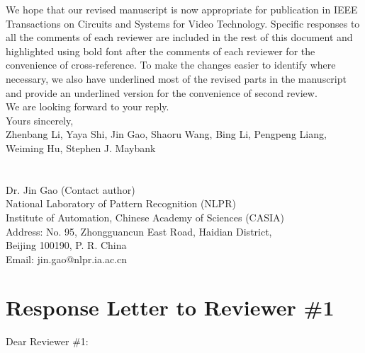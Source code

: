 \documentclass[12pt]{article}
\begin{document}
We hope that our revised manuscript is now appropriate for publication in IEEE Transactions on Circuits and Systems for Video Technology. Specific responses to all the comments of each reviewer are included in the rest of this document and highlighted using bold font after the comments of each reviewer for the convenience of cross-reference. To make the changes easier to identify where necessary, we also have underlined most of the revised parts in the manuscript and provide an underlined version for the convenience of second review.\\[10pt]
\indent We are looking forward to your reply.\\[10pt]
\noindent Yours sincerely,\\
\noindent Zhenbang Li, Yaya Shi, Jin Gao, Shaoru Wang, Bing Li, Pengpeng Liang, Weiming Hu, Stephen J. Maybank
\\
\\
\\
\noindent Dr. Jin Gao (Contact author)\\
\noindent National Laboratory of Pattern Recognition (NLPR)\\
\noindent Institute of Automation, Chinese Academy of Sciences (CASIA)\\
\noindent Address: No. 95, Zhongguancun East Road, Haidian District,\\
\noindent Beijing 100190, P. R. China\\
\noindent Email: jin.gao@nlpr.ia.ac.cn

\newpage
{\centering\section*{Response Letter to Reviewer \#1}}
\noindent Dear Reviewer \#1:
\end{document}
